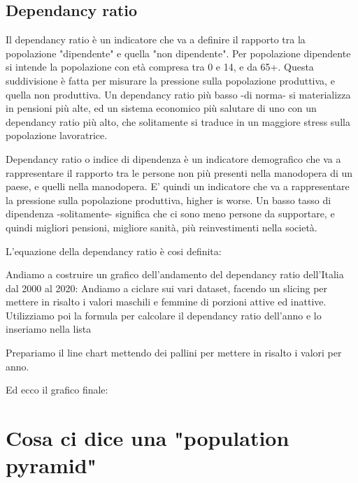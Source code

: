 \documentclass[11pt, oneside]{article}   	%
\begin{document}
\subsection{Dependancy ratio}
Il dependancy ratio è un indicatore che va a definire il rapporto tra la popolazione "dipendente" e quella "non dipendente". Per popolazione dipendente si intende la popolazione con età compresa tra 0 e 14, e da 65+.
Questa suddivisione è fatta per misurare la pressione sulla popolazione produttiva, e quella non produttiva. Un dependancy ratio più basso -di norma- si materializza in pensioni più alte, ed un sistema economico più salutare di uno con un dependancy ratio più alto, che solitamente si traduce in un maggiore stress sulla popolazione lavoratrice.

Dependancy ratio o indice di dipendenza è un indicatore demografico che va a rappresentare il rapporto tra le persone non più presenti nella manodopera di un paese, e quelli nella manodopera. E' quindi un indicatore che va a rappresentare la pressione sulla popolazione produttiva, higher is worse. Un basso tasso di dipendenza -solitamente- significa che ci sono meno persone da supportare, e quindi migliori pensioni, migliore sanità, più reinvestimenti nella società.


L'equazione della dependancy ratio è cosi definita:
\begin{center}
\end{center}
Andiamo a costruire un grafico dell'andamento del dependancy ratio dell'Italia dal 2000 al 2020:
Andiamo a ciclare sui vari dataset, facendo un slicing per mettere in risalto i valori maschili e femmine di porzioni attive ed inattive. Utilizziamo poi la formula per calcolare il dependancy ratio dell'anno e lo inseriamo nella lista
\begin{center}
\end{center}
Prepariamo il line chart mettendo dei pallini per mettere in risalto i valori per anno.
\begin{center}
\end{center}
Ed ecco il grafico finale:
\begin{center}
\end{center}

\section{Cosa ci dice una "population pyramid"}
\end{document}
